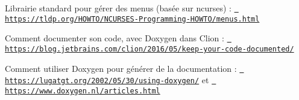 \begin{DoxyItemize}
\item Librairie standard pour gérer des menus (basée sur ncurses) \+: \href{https://tldp.org/HOWTO/NCURSES-Programming-HOWTO/menus.html}{\texttt{ https\+://tldp.\+org/\+HOWTO/\+NCURSES-\/\+Programming-\/\+HOWTO/menus.\+html}}
\item Comment documenter son code, avec Doxygen dans Clion \+: \href{https://blog.jetbrains.com/clion/2016/05/keep-your-code-documented/}{\texttt{ https\+://blog.\+jetbrains.\+com/clion/2016/05/keep-\/your-\/code-\/documented/}}
\item Comment utiliser Doxygen pour générer de la documentation \+: \href{https://lugatgt.org/2002/05/30/using-doxygen/}{\texttt{ https\+://lugatgt.\+org/2002/05/30/using-\/doxygen/}} et \href{https://www.doxygen.nl/articles.html}{\texttt{ https\+://www.\+doxygen.\+nl/articles.\+html}} 
\end{DoxyItemize}